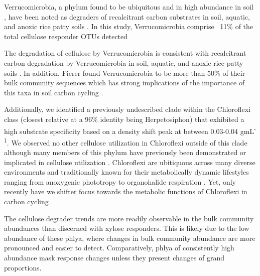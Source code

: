 Verrucomicrobia, a phylum found to be ubiquitous and in high abundance in soil \cite{Zhang_2008, Bergmann_2011, Fierer_2013}, have been noted as degraders of recalcitrant carbon substrates in soil, aquatic, and anoxic rice patty soils \cite{Fierer_2013,Herlemann_2013,10543821}. In this study, Verrucomicrobia comprise ~11\% of the total cellulose responder OTUs detected    

The degradation of cellulose by Verrucomicrobia is consistent with recalcitrant carbon degradation by Verrucomicrobia in soil, aquatic, and anoxic rice patty soils \cite{Fierer_2013,Herlemann_2013,10543821}. In addition, Fierer found Verrucomicrobia to be more than 50\% of their bulk community sequences which has strong implications of the importance of this taxa in soil carbon cycling \cite{Fierer_2013}.
  

Additionally, we identified a previously undescribed clade within the Chloroflexi class (closest relative at a 96\% identity being Herpetosiphon) that exhibited a high substrate specificity based on a density shift peak at between 0.03-0.04 gmL\textsuperscript{-1}. We observed no other cellulose utilization in Chloroflexi outside of this clade although many members of this phylum have previously been demonstrated or implicated in cellulose utilization \cite{Goldfarb_2011,Cole_2013,Hug_2013,}. Chloroflexi are ubitiquous across many diverse environments and traditionally known for their metabolically dynamic lifestyles ranging from anoxygenic phototropy to organohalide respiration \cite{Yamada_2009,14527284,Hug_2013,Seshadri_2005,Tang_2011,dworkin2006the}. Yet, only recently have we shifter focus towards the metabolic functions of Chloroflexi in carbon cycling \cite{Hug_2013,Goldfarb_2011,Cole_2013}.


The cellulose degrader trends are more readily observable in the bulk community abundances than discerned with xylose responders. This is likely due to the low abundance of these phlya, where changes in bulk community abundance are more pronounced and easier to detect. Comparatively, phlya of consistently high abundance mask response changes unless they present changes of grand proportions.          





